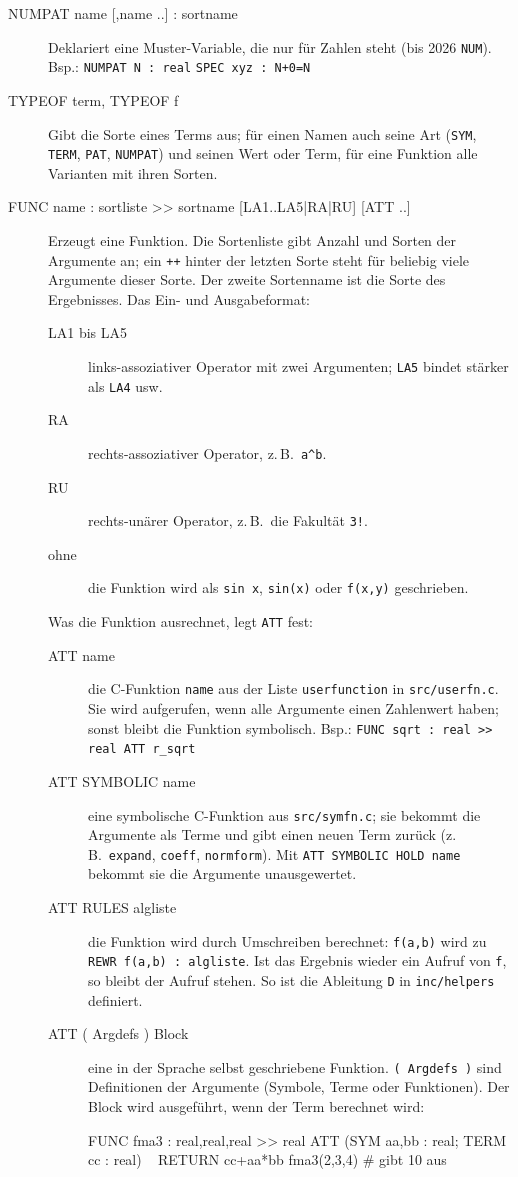 \documentclass[a4paper,11pt]{article}
\newcommand{\kw}[1]{\texttt{#1}}
\begin{document}
\begin{description}
\item[NUMPAT name {[},name ..{]} : sortname]
  Deklariert eine Muster-Variable, die nur für Zahlen steht (bis 2026
  \kw{NUM}). Bsp.: \kw{NUMPAT N : real} \quad \kw{SPEC xyz : N+0=N}

\item[TYPEOF term, TYPEOF f]
  Gibt die Sorte eines Terms aus; für einen Namen auch seine Art
  (\kw{SYM}, \kw{TERM}, \kw{PAT}, \kw{NUMPAT}) und seinen Wert oder Term,
  für eine Funktion alle Varianten mit ihren Sorten.

\item[FUNC name : sortliste >{}> sortname {[}LA1..LA5|RA|RU{]} {[}ATT ..{]}]
  Erzeugt eine Funktion. Die Sortenliste gibt Anzahl und Sorten der
  Argumente an; ein \kw{++} hinter der letzten Sorte steht für beliebig
  viele Argumente dieser Sorte. Der zweite Sortenname ist die Sorte des
  Ergebnisses. Das Ein- und Ausgabeformat:
  \begin{description}
  \item[LA1 bis LA5] links-assoziativer Operator mit zwei Argumenten;
    \kw{LA5} bindet stärker als \kw{LA4} usw.
  \item[RA] rechts-assoziativer Operator, z.\,B.\ \verb|a^b|.
  \item[RU] rechts-unärer Operator, z.\,B.\ die Fakultät \kw{3!}.
  \item[ohne] die Funktion wird als \kw{sin x}, \kw{sin(x)} oder
    \kw{f(x,y)} geschrieben.
  \end{description}
  Was die Funktion ausrechnet, legt \kw{ATT} fest:
  \begin{description}
  \item[ATT name] die C-Funktion \kw{name} aus der Liste
    \kw{userfunction} in \kw{src/userfn.c}. Sie wird aufgerufen, wenn alle
    Argumente einen Zahlenwert haben; sonst bleibt die Funktion symbolisch.
    Bsp.: \kw{FUNC sqrt : real >{}> real ATT r\_sqrt}
  \item[ATT SYMBOLIC name] eine symbolische C-Funktion aus
    \kw{src/symfn.c}; sie bekommt die Argumente als Terme und gibt einen
    neuen Term zurück (z.\,B.\ \kw{expand}, \kw{coeff}, \kw{normform}).
    Mit \kw{ATT SYMBOLIC HOLD name} bekommt sie die Argumente
    unausgewertet.
  \item[ATT RULES algliste] die Funktion wird durch Umschreiben berechnet:
    \kw{f(a,b)} wird zu \kw{REWR f(a,b) : algliste}. Ist das Ergebnis
    wieder ein Aufruf von \kw{f}, so bleibt der Aufruf stehen. So ist die
    Ableitung \kw{D} in \kw{inc/helpers} definiert.
  \item[ATT ( Argdefs ) Block] eine in der Sprache selbst geschriebene
    Funktion. \kw{( Argdefs )} sind Definitionen der Argumente (Symbole,
    Terme oder Funktionen). Der Block wird ausgeführt, wenn der Term
    berechnet wird:
\begin{beispiel}
FUNC fma3 : real,real,real >> real ATT (SYM aa,bb : real; TERM cc : real) \
            { RETURN cc+aa*bb }
fma3(2,3,4)          # gibt 10 aus
\end{beispiel}
  \end{description}


\end{description}
\end{document}
